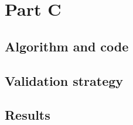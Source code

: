\section{Part C}

\subsection{Algorithm and code}

\subsection{Validation strategy}

\subsection{Results}
